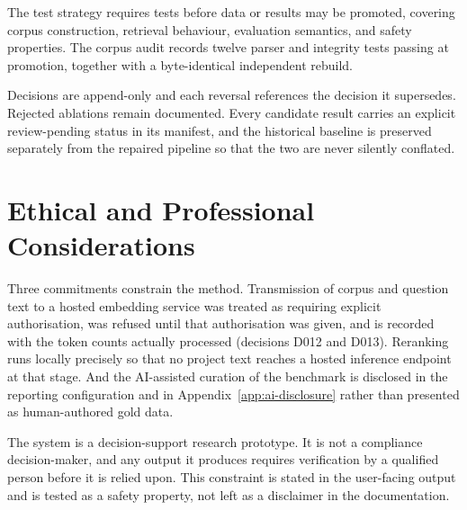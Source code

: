 The test strategy requires tests before data or results may be promoted, covering corpus construction, retrieval behaviour, evaluation semantics, and safety properties. The corpus audit records twelve parser and integrity tests passing at promotion, together with a byte-identical independent rebuild.

Decisions are append-only and each reversal references the decision it supersedes. Rejected ablations remain documented. Every candidate result carries an explicit review-pending status in its manifest, and the historical baseline is preserved separately from the repaired pipeline so that the two are never silently conflated.

\section{Ethical and Professional Considerations}
\label{sec:method-ethics}

Three commitments constrain the method. Transmission of corpus and question text to a hosted embedding service was treated as requiring explicit authorisation, was refused until that authorisation was given, and is recorded with the token counts actually processed (decisions D012 and D013). Reranking runs locally precisely so that no project text reaches a hosted inference endpoint at that stage. And the \ac{AI}-assisted curation of the benchmark is disclosed in the reporting configuration and in Appendix~\ref{app:ai-disclosure} rather than presented as human-authored gold data.

The system is a decision-support research prototype. It is not a compliance decision-maker, and any output it produces requires verification by a qualified person before it is relied upon. This constraint is stated in the user-facing output and is tested as a safety property, not left as a disclaimer in the documentation.
